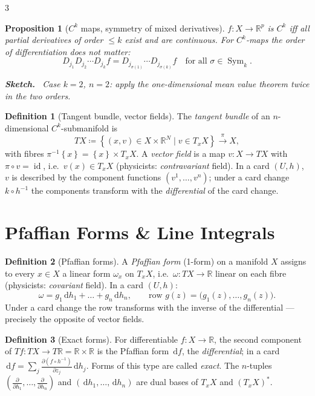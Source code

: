\documentclass[10pt,a4paper,landscape]{article}
\theoremstyle{definition}
\newtheorem{defn}{Definition}[section]
\theoremstyle{plain}
\newtheorem{prop}{Proposition}[section]
\theoremstyle{remark}
\newcommand{\R}{\mathbb{R}}
\newcommand{\dd}{\,\mathrm{d}}
\newcommand{\id}{\operatorname{id}}
\newcommand{\set}[1]{\left\{ #1 \right\}}
\newcommand{\deq}{\coloneqq}
\newcommand{\comp}{\circ}
\DeclareMathOperator{\Sym}{Sym}
\newenvironment{proofsketch}{%
  \par\small\color{exgray}\textbf{Sketch.}\ }%
  {\par}
\begin{document}
\begin{multicols*}{3}
\begin{prop}[$C^k$ maps, symmetry of mixed derivatives]
$f: X \to \R^p$ is $C^k$ iff all partial derivatives of order $\le k$ exist and are continuous. For $C^k$-maps the order of differentiation does not matter:
{\footnotesize\[
D_{j_1} D_{j_2} \cdots D_{j_k} f = D_{j_{\sigma(1)}} \cdots D_{j_{\sigma(k)}} f \quad \text{for all } \sigma \in \Sym_k .
\]}
\begin{proofsketch}
Case $k = 2$, $n = 2$: apply the one-dimensional mean value theorem twice in the two orders.
\end{proofsketch}
\end{prop}

\begin{defn}[Tangent bundle, vector fields]
The \emph{tangent bundle} of an $n$-dimensional $C^k$-submanifold is
\[
TX \deq \set{(x, v) \in X \times \R^N \mid v \in T_x X} \xrightarrow{\;\pi\;} X,
\]
with fibres $\pi^{-1}\set{x} = \set{x} \times T_xX$. A \emph{vector field} is a map $v: X \to TX$ with $\pi \comp v = \id$, i.e.\ $v(x) \in T_xX$ (physicists: \emph{contravariant} field). In a card $(U,h)$, $v$ is described by the component functions $(v^1, \dots, v^n)$; under a card change $k \comp h^{-1}$ the components transform with the \emph{differential} of the card change.
\end{defn}

\section{Pfaffian Forms \& Line Integrals}

\begin{defn}[Pfaffian forms]
A \emph{Pfaffian form} (1-form) on a manifold $X$ assigns to every $x \in X$ a linear form $\omega_x$ on $T_xX$, i.e.\ $\omega: TX \to \R$ linear on each fibre (physicists: \emph{covariant} field). In a card $(U,h)$:
{\footnotesize\[
\omega = g_1 \dd h_1 + \dots + g_n \dd h_n, \qquad \text{row } g(z) = \bigl(g_1(z), \dots, g_n(z)\bigr).
\]}
Under a card change the row transforms with the inverse of the differential --- precisely the opposite of vector fields.
\end{defn}

\begin{defn}[Exact forms]
For differentiable $f: X \to \R$, the second component of $Tf: TX \to T\R = \R \times \R$ is the Pfaffian form $\dd f$, the \emph{differential}; in a card $\dd f = \sum_j \frac{\partial(f \comp h^{-1})}{\partial z_j} \dd h_j$. Forms of this type are called \emph{exact}. The $n$-tuples $(\frac{\partial}{\partial h_1}, \dots, \frac{\partial}{\partial h_n})$ and $(\dd h_1, \dots, \dd h_n)$ are dual bases of $T_xX$ and $(T_xX)^*$.
\end{defn}


\end{multicols*}
\end{document}
